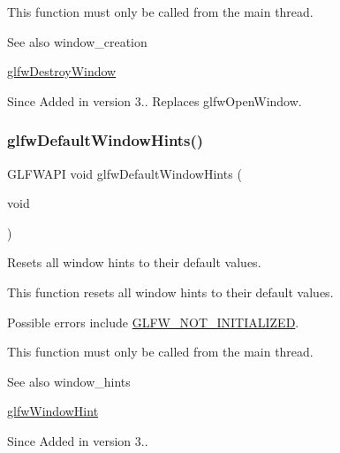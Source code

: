 This function must only be called from the main thread.

\begin{DoxySeeAlso}{See also}
window\+\_\+creation 

\hyperlink{group__window_ga806747476b7247d292be3711c323ea10}{glfw\+Destroy\+Window}
\end{DoxySeeAlso}
\begin{DoxySince}{Since}
Added in version 3.. Replaces {\ttfamily glfw\+Open\+Window}. 
\end{DoxySince}
\mbox{\label{group__window_ga8050ddceed9dc6bd9d3aa35666195cd4}} 
\subsubsection{\texorpdfstring{glfw\+Default\+Window\+Hints()}{glfwDefaultWindowHints()}}
{\footnotesize\ttfamily G\+L\+F\+W\+A\+PI void glfw\+Default\+Window\+Hints (\begin{DoxyParamCaption}\item[{void}]{ }\end{DoxyParamCaption})}



Resets all window hints to their default values. 

This function resets all window hints to their default values.

Possible errors include \hyperlink{group__errors_ga2374ee02c177f12e1fa76ff3ed15e14a}{G\+L\+F\+W\+\_\+\+N\+O\+T\+\_\+\+I\+N\+I\+T\+I\+A\+L\+I\+Z\+ED}.

This function must only be called from the main thread.

\begin{DoxySeeAlso}{See also}
window\+\_\+hints 

\hyperlink{group__window_ga69c40728499720bef8a49aa925ea0efa}{glfw\+Window\+Hint}
\end{DoxySeeAlso}
\begin{DoxySince}{Since}
Added in version 3.. 
\end{DoxySince}
\mbox{\label{group__window_ga806747476b7247d292be3711c323ea10}} 
